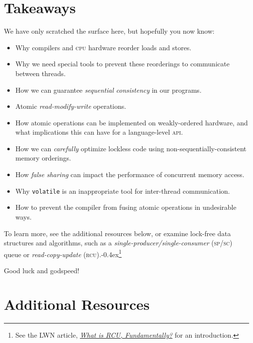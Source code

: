 \documentclass[fontsize=10pt, oneside]{scrartcl}
\newcommand{\punckern}{\kern-0.4ex}
\newcommand{\monobox}[1]{\mbox{\texttt{#1}}}
\newcommand{\keyword}[1]{\monobox{\color{darkGreen}#1}}
\newcommand{\introduce}[1]{\textit{#1}}
\begin{document}
\section{Takeaways}

We have only scratched the surface here, but hopefully you now know:
\begin{itemize}
\item Why compilers and \textsc{cpu} hardware reorder loads and stores.
\item Why we need special tools to prevent these reorderings to communicate between threads.
\item How we can guarantee \introduce{sequential consistency} in our programs.
\item Atomic \introduce{read-modify-write} operations.
\item How atomic operations can be implemented on weakly-ordered hardware,
      and what implications this can have for a language-level \textsc{api}.
\item How we can \emph{carefully} optimize lockless code using non-sequentially-consistent memory orderings.
\item How \introduce{false sharing} can impact the performance of concurrent memory access.
\item Why \keyword{volatile} is an inappropriate tool for inter-thread communication.
\item How to prevent the compiler from fusing atomic operations in undesirable ways.
\end{itemize}
To learn more, see the additional resources below,
or examine lock-free data structures and algorithms,
such as a \introduce{single-producer/single-consumer} \textsc{(sp/sc)} queue or \introduce{read-copy-update}
\textsc{(rcu)}.\punckern\footnote{See the LWN article,
\href{https://lwn.net/Articles/262464/}{\textit{What is RCU, Fundamentally?}}
for an introduction.}

\vspace{\baselineskip}
\noindent Good luck and godspeed!
\newpage

\appendix
\setcounter{secnumdepth}{0}
\setfootnoterule{0pt}

\setlength\parskip{\baselineskip}
\setlength\parindent{0pt}
\section{Additional Resources}
\end{document}
